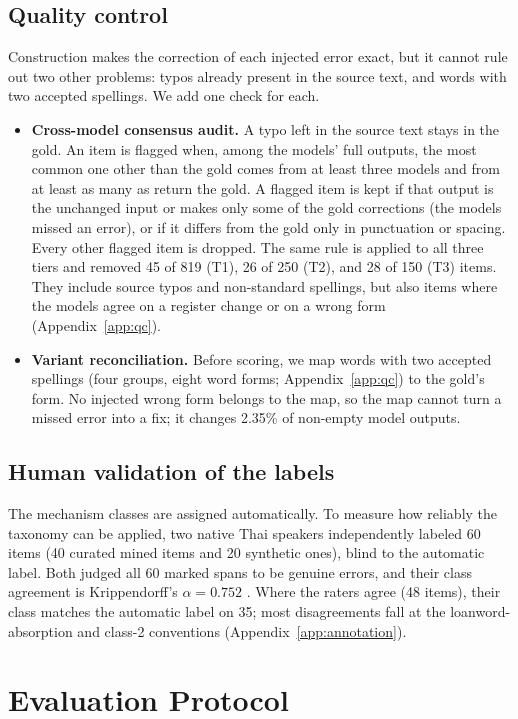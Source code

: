 \documentclass[11pt]{article}
\begin{document}
\subsection{Quality control}
\label{sec:qc}
Construction makes the correction of each injected error exact, but it cannot rule out two other
problems: typos already present in the source text, and words with two accepted spellings. We add
one check for each.
\begin{itemize}\itemsep2pt
\item \textbf{Cross-model consensus audit.} A typo left in the source text stays in the gold. An
item is flagged when, among the models' full outputs, the most common one other than the gold
comes from at least three models and from at least as many as return the gold. A flagged item is kept if that output is the unchanged input or makes only some of the
gold corrections (the models missed an error), or if it differs from the gold only in punctuation
or spacing. Every other flagged item is dropped. The same rule is applied to all three tiers and
removed 45 of 819 (T1), 26 of 250 (T2), and 28 of 150 (T3) items. They include source typos and
non-standard spellings, but also items where the models agree on a register change or on a
wrong form (Appendix~\ref{app:qc}).
\item \textbf{Variant reconciliation.} Before scoring, we map words with two accepted spellings
(four groups, eight word forms; Appendix~\ref{app:qc}) to the gold's form. No injected wrong
form belongs to the map, so the map cannot turn a missed error into a fix; it changes 2.35\% of
non-empty model outputs.
\end{itemize}

\subsection{Human validation of the labels}
\label{sec:annotation}
The mechanism classes are assigned automatically. To measure how reliably the taxonomy can be
applied, two native Thai speakers independently labeled 60 items (40 curated mined items and 20
synthetic ones), blind to the automatic label. Both judged all 60 marked spans to be genuine
errors, and their class agreement is Krippendorff's $\alpha = 0.752$
\citep{krippendorff-2011-computing}. Where the raters agree (48 items), their class matches the
automatic label on 35; most disagreements fall at the loanword-absorption and class-2 conventions
(Appendix~\ref{app:annotation}).

\section{Evaluation Protocol}
\end{document}

